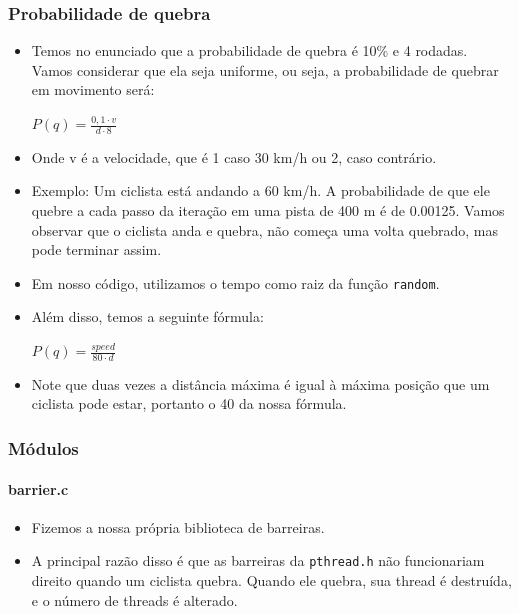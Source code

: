 \documentclass{beamer}
\begin{document}
\begin{frame}
	\frametitle{Probabilidade de quebra}
	\begin{itemize}
		\item Temos no enunciado que a probabilidade de quebra é 10\% e 4 rodadas. 
		Vamos considerar que ela seja uniforme, ou seja, a probabilidade de quebrar em movimento será: \\
		\begin{center} 
			$P(q) = \frac{0,1 \cdot v}{d \cdot 8}$
		\end{center}
		\item Onde v é a velocidade, que é 1 caso 30 km/h ou 2, caso contrário.
		\item Exemplo: Um ciclista está andando a 60 km/h. A probabilidade de que ele quebre a cada passo da iteração em uma pista de 400 m é de 0.00125.
		Vamos observar que o ciclista anda e quebra, não começa uma volta quebrado, mas pode terminar assim. 
		
	\end{itemize}
\end{frame}

\begin{frame}
	\begin{itemize}
		\item Em nosso código, utilizamos o tempo como raiz da função \texttt{random}.
		\item Além disso, temos a seguinte fórmula:
		\begin{center} 
			$P(q) = \frac{speed}{80 \cdot d}$
		\end{center}
		\item Note que duas vezes a distância máxima é igual à máxima posição que um ciclista pode estar, portanto o 40 da nossa fórmula.
	\end{itemize}
\end{frame}

\begin{frame}
	\frametitle{Módulos}
	\framesubtitle{barrier.c}
	\begin{itemize}
		\item Fizemos a nossa própria biblioteca de barreiras. 
		\item A principal razão disso é que as barreiras da \texttt{pthread.h} não funcionariam direito quando um ciclista quebra. Quando ele quebra, sua thread é destruída, e o número de threads é alterado.
	\end{itemize}
\end{frame}
\end{document}
